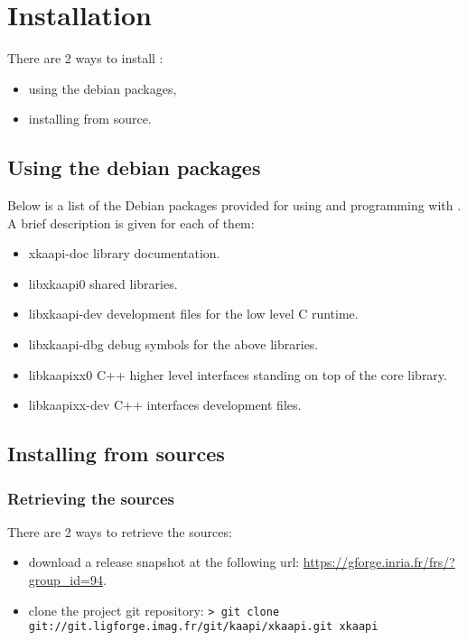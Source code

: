 \section{Installation}

There are 2 ways to install \kaapi:
\begin{itemize}
\item using the debian packages,
\item installing from source.
\end{itemize}

\subsection{Using the debian packages}
Below is a list of the Debian packages provided for
using and programming with \kaapi. A brief description
is given for each of them:
\begin{itemize}
\item{xkaapi-doc}\newline
\kaapi library documentation.
\item{libxkaapi0}\newline
\kaapi shared libraries.
\item{libxkaapi-dev}\newline
\kaapi development files for the low level C runtime.
\item{libxkaapi-dbg}\newline
\kaapi debug symbols for the above libraries.
\item{libkaapixx0}\newline
\kaapi C++ higher level interfaces standing on top of
the \kaapi core library.
\item{libkaapixx-dev}\newline
\kaapi C++ interfaces development files.
\end{itemize}

\subsection{Installing from sources}

\subsubsection{Retrieving the sources}
There are 2 ways to retrieve the sources:
\begin{itemize}
\item download a release snapshot at the following url:\newline
\url{https://gforge.inria.fr/frs/?group_id=94}.
\item clone the project git repository:\newline
\verb+> git clone git://git.ligforge.imag.fr/git/kaapi/xkaapi.git xkaapi+
\end{itemize}

